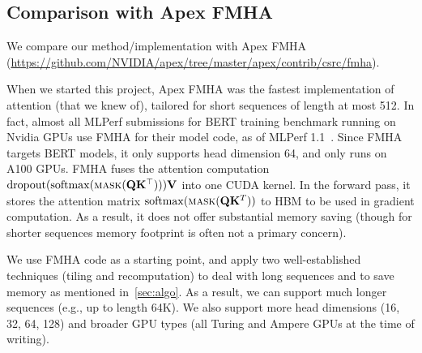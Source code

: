 \documentclass{article}
\newcommand{\softmax}{\mathrm{softmax}}
\newcommand{\vQ}{\mathbf{Q}}
\newcommand{\vK}{\mathbf{K}}
\newcommand{\vV}{\mathbf{V}}
\begin{document}
\subsection{Comparison with Apex FMHA}
\label{supp:fmha}

We compare our method/implementation with Apex FMHA
(\url{https://github.com/NVIDIA/apex/tree/master/apex/contrib/csrc/fmha}).

When we started this project, Apex FMHA was the fastest implementation of
attention (that we knew of), tailored for short sequences of length at most 512.
In fact, almost all MLPerf submissions for BERT training benchmark running on
Nvidia GPUs use FMHA for their model code, as of MLPerf
1.1~\citep{mattson2020mlperf}.
Since FMHA targets BERT models, it only supports head
dimension 64, and only runs on A100 GPUs.
FMHA fuses the attention computation
$\mathrm{dropout}(\softmax(\textsc{mask}(\vQ \vK^\top))) \vV$ into one CUDA kernel.
In the forward pass, it stores the attention matrix
$\softmax(\textsc{mask}(\vQ \vK^T))$ to HBM to be used in gradient computation.
As a result, it does not offer substantial memory saving (though for shorter
sequences memory footprint is often not a primary concern).

We use FMHA code as a starting point, and apply two well-established techniques
(tiling and recomputation) to deal with long sequences and to save memory as
mentioned in~\cref{sec:algo}.
As a result, we can support much longer sequences (e.g., up to length 64K).
We also support more head dimensions (16, 32, 64, 128) and broader GPU types
(all Turing and Ampere GPUs at the time of writing).
\end{document}
